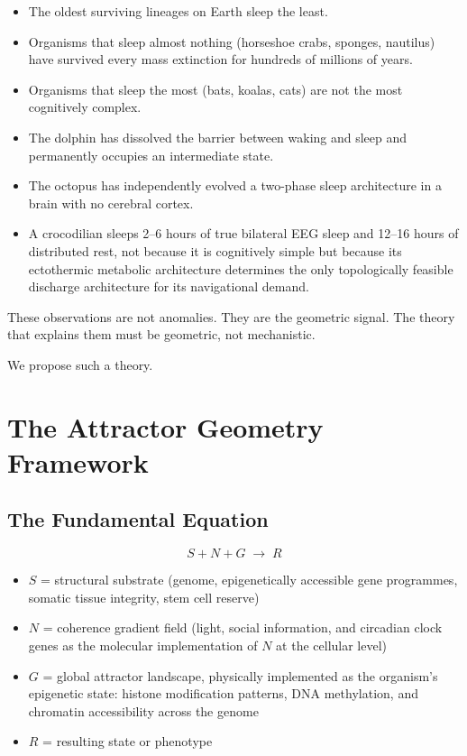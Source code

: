 \documentclass[10pt, a4paper]{article}
\begin{document}
\begin{itemize}[itemsep=0.2em]
  \item The oldest surviving lineages
    on Earth sleep the least.
  \item Organisms that sleep almost
    nothing (horseshoe crabs, sponges,
    nautilus) have survived every mass
    extinction for hundreds of millions
    of years.
  \item Organisms that sleep the most
    (bats, koalas, cats) are not the
    most cognitively complex.
  \item The dolphin has dissolved the
    barrier between waking and sleep
    and permanently occupies an
    intermediate state.
  \item The octopus has independently
    evolved a two-phase sleep
    architecture in a brain with
    no cerebral cortex.
  \item A crocodilian sleeps 2--6 hours
    of true bilateral EEG sleep and
    12--16 hours of distributed rest,
    not because it is cognitively
    simple but because its ectothermic
    metabolic architecture determines
    the only topologically feasible
    discharge architecture for
    its navigational demand.
\end{itemize}

These observations are not anomalies.
They are the geometric signal. The
theory that explains them must be
geometric, not mechanistic.

We propose such a theory.

\section{The Attractor Geometry
Framework}
\label{sec:framework}

\subsection{The Fundamental Equation}

\[
S + N + G \;\rightarrow\; R
\]

\begin{itemize}[itemsep=0.2em]
  \item $S$ = structural substrate
    (genome, epigenetically accessible
    gene programmes, somatic tissue
    integrity, stem cell reserve)
  \item $N$ = coherence gradient field
    (light, social information, and
    circadian clock genes as the
    molecular implementation of $N$
    at the cellular level)
  \item $G$ = global attractor landscape,
    physically implemented as the
    organism's epigenetic state:
    histone modification patterns,
    DNA methylation, and chromatin
    accessibility across the genome
  \item $R$ = resulting state or
    phenotype
\end{itemize}
\end{document}
